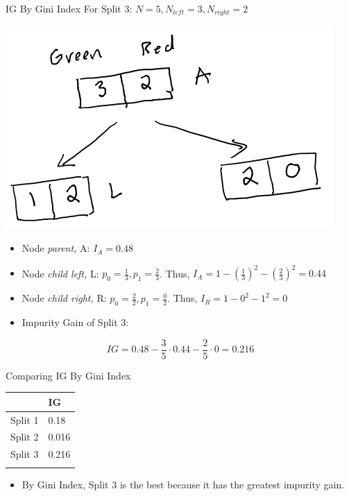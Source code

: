 \documentclass[
  ignorenonframetext,
]{beamer}
\providecommand{\tightlist}{%
  \setlength{\itemsep}{0pt}\setlength{\parskip}{0pt}}\usepackage{longtable,booktabs,array}
\begin{document}
\begin{frame}{IG By Gini Index}
\label{ig-by-gini-index-2}
For Split 3: \(N = 5, N_{left} =3, N_{right} = 2\)

\includegraphics{images/im2.png}

\begin{itemize}
\item
  Node \emph{parent,} A: \(I_{A} = 0.48\)
\item
  Node \emph{child left,} L: \(p_0 = \frac{1}{3}, p_1 = \frac{2}{3}\).
  Thus, \(I_{A} = 1-(\frac{1}{3})^2 -(\frac{2}{3})^2 = 0.44\)
\item
  Node \emph{child right,} R: \(p_0 = \frac{2}{2}, p_1 = \frac{0}{2}\).
  Thus, \(I_{R} = 1-0^2-1^2 = 0\)
\item
  Impurity Gain of Split 3:
\end{itemize}

\[IG = 0.48 - \frac{3}{5} \cdot 0.44 - \frac{2}{5} \cdot 0 = 0.216\]
\end{frame}

\begin{frame}{Comparing IG By Gini Index}
\label{comparing-ig-by-gini-index}
\begin{longtable}[]{@{}ll@{}}
\toprule\noalign{}
& IG \\
\midrule\noalign{}
\endhead
Split 1 & 0.18 \\
Split 2 & 0.016 \\
Split 3 & 0.216 \\
\bottomrule\noalign{}
\end{longtable}

\begin{itemize}
\tightlist
\item
  By Gini Index, Split 3 is the best because it has the greatest
  impurity gain.
\end{itemize}
\end{frame}
\end{document}
